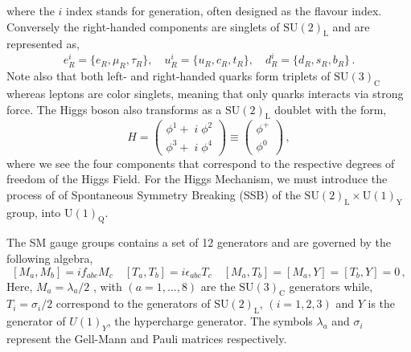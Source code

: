 \documentclass[10pt]{report}
\newcommand{\U}[1]{\mathrm{U}(1)_{\mathrm{#1}}}
\newcommand{\SU}[1]{\mathrm{SU}(2)_{\mathrm{#1}}}
\begin{document}
%
where the $i$ index stands for generation, often designed as the flavour index. Conversely the right-handed components are singlets of  $\SU{L}$ and are represented as,
%
\begin{equation}
e^i_R=\{e_R,\mu_R,\tau_R\}, \quad  u^i_R=\{u_R,c_R,t_R\}, \quad d^i_R=\{d_{R},s_{R},b_{R}\} \, . 
\end{equation}
%
Note also that both left- and right-handed quarks form triplets of $\mathrm{SU(3)_C}$ whereas leptons are color singlets, meaning that only quarks interacts via strong force. The Higgs boson also transforms as a $\mathrm{SU(2)_L}$ doublet with the form,
%
\begin{equation}
H=\begin{pmatrix}
\phi^1 + \; i \; \phi^2 \\
\phi^3 + \; i \; \phi^4  
\end{pmatrix} \equiv \begin{pmatrix}
\phi^+ \\
\phi^0 
\end{pmatrix} \, , 
\end{equation}
%
where we see the four components that correspond to the respective degrees of freedom of the Higgs Field. For the Higgs Mechanism, we must introduce the process of of Spontaneous Symmetry Breaking (SSB) of the $\mathrm{SU(2)_L} \times \U{Y}$ group, into $\mathrm{U(1)_Q}$.


The SM gauge groups contains a set of 12 generators and are governed by the following algebra, 
% 
\begin{equation}
\left[ M_a , M_b \right] = i f_{abc} M_c \quad \left[ T_a , T_b \right ] = i \epsilon_{abc} T_c \quad \left[ M_a , T_b \right] = \left[ M_a , Y \right] = \left[ T_b,Y \right] = 0  \, , 
\end{equation}
%
Here, $M_a = {\lambda_a}/{2}$ , with $(a = 1, . . . , 8)$ are the $\mathrm{SU(3)_{C}}$ generators while, $T_i= \sigma_i/{2} $ correspond to the generators of $\mathrm{SU(2)_L}$, $(i = 1, 2, 3)$ and $Y$ is the generator of $U(1)_Y$, the hypercharge generator.
The symbols $\lambda_a$ and $\sigma_i$ represent the Gell-Mann and Pauli matrices respectively. 
%
\end{document}
